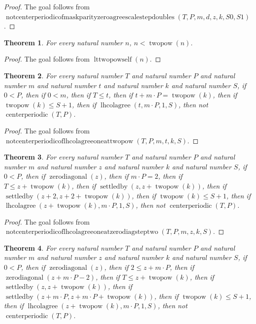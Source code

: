 \documentclass[11pt]{article}
\newtheorem{theorem}{Theorem}[section]
\theoremstyle{definition}
\begin{document}
\begin{proof}
The goal follows from \(\operatorname{notcenterperiodicofmaskparityzeroagreescalestepdoubles}(T, P, m, d, z, k, S0, S1)\).
\end{proof}
\begin{theorem}
\label{ll:paper:lt-twopow-self}
For every natural number \(n\), \(n < \operatorname{twopow}(n)\).
\end{theorem}
\begin{proof}
The goal follows from \(\operatorname{lttwopowself}(n)\).
\end{proof}
\begin{theorem}
\label{ll:paper:not-centerperiodic-of-lhcolagree-one-at-twopow}
For every natural number \(T\) and natural number \(P\) and natural number \(m\) and natural number \(t\) and natural number \(k\) and natural number \(S\), if \(0 < P\), then if \(0 < m\), then if \(T \le t\), then if \(t + m \cdot P = \operatorname{twopow}(k)\), then if \(\operatorname{twopow}(k) \le S + 1\), then if \(\operatorname{lhcolagree}(t, m \cdot P, 1, S)\), then not \(\operatorname{centerperiodic}(T, P)\).
\end{theorem}
\begin{proof}
The goal follows from \(\operatorname{notcenterperiodicoflhcolagreeoneattwopow}(T, P, m, t, k, S)\).
\end{proof}
\begin{theorem}
\label{ll:paper:not-centerperiodic-of-lhcolagree-one-at-zero-diag-step-two}
For every natural number \(T\) and natural number \(P\) and natural number \(m\) and natural number \(z\) and natural number \(k\) and natural number \(S\), if \(0 < P\), then if \(\operatorname{zerodiagonal}(z)\), then if \(m \cdot P = 2\), then if \(T \le z + \operatorname{twopow}(k)\), then if \(\operatorname{settledby}(z, z + \operatorname{twopow}(k))\), then if \(\operatorname{settledby}(z + 2, z + 2 + \operatorname{twopow}(k))\), then if \(\operatorname{twopow}(k) \le S + 1\), then if \(\operatorname{lhcolagree}(z + \operatorname{twopow}(k), m \cdot P, 1, S)\), then not \(\operatorname{centerperiodic}(T, P)\).
\end{theorem}
\begin{proof}
The goal follows from \(\operatorname{notcenterperiodicoflhcolagreeoneatzerodiagsteptwo}(T, P, m, z, k, S)\).
\end{proof}
\begin{theorem}
\label{ll:paper:not-centerperiodic-of-lhcolagree-one-of-two-zero-diags}
For every natural number \(T\) and natural number \(P\) and natural number \(m\) and natural number \(z\) and natural number \(k\) and natural number \(S\), if \(0 < P\), then if \(\operatorname{zerodiagonal}(z)\), then if \(2 \le z + m \cdot P\), then if \(\operatorname{zerodiagonal}(z + m \cdot P - 2)\), then if \(T \le z + \operatorname{twopow}(k)\), then if \(\operatorname{settledby}(z, z + \operatorname{twopow}(k))\), then if \(\operatorname{settledby}(z + m \cdot P, z + m \cdot P + \operatorname{twopow}(k))\), then if \(\operatorname{twopow}(k) \le S + 1\), then if \(\operatorname{lhcolagree}(z + \operatorname{twopow}(k), m \cdot P, 1, S)\), then not \(\operatorname{centerperiodic}(T, P)\).
\end{theorem}
\end{document}
